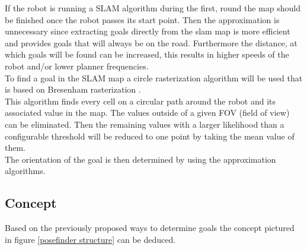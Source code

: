 If the robot is running a SLAM algorithm during the first, round the map should be finished once the robot passes its start point. Then the approximation is unnecessary since extracting goals directly from the slam map is more efficient and provides goals that will  always be on the road. Furthermore the distance, at which goals will be found can be increased, this results in higher speeds of the robot and/or lower planner frequencies.\\

To find a goal in the SLAM map a circle rasterization algorithm will be used that is based on Bresenham rasterization \cite{ComputerGraphics}.\\

This algorithm finds every cell on a circular path around the robot and its associated value in the map. The values outside of a given FOV (field of view) can be eliminated. Then the remaining values with a larger likelihood than a configurable threshold will be reduced to one point by taking the mean value of them.\\

The orientation of the goal is then determined by using the approximation algorithms.

\subsection{Concept}

Based on the previously proposed ways to determine goals the concept pictured in figure \ref{posefinder structure} can be deduced.\\

